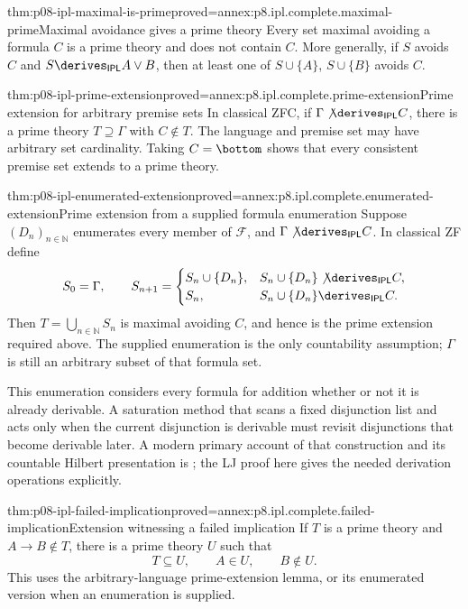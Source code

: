 \begin{hblemma}{thm:p08-ipl-maximal-is-prime}{proved=annex:p8.ipl.complete.maximal-prime}{Maximal avoidance gives a prime theory}
Every set maximal avoiding a formula \(C\) is a prime theory and does
not contain \(C\). More generally, if \(S\) avoids \(C\) and
\(S\derives_{\mathsf{IPL}}A\lor B\), then at least one of
\(S\cup\{A\}\), \(S\cup\{B\}\) avoids \(C\).
\end{hblemma}

\begin{hblemma}{thm:p08-ipl-prime-extension}{proved=annex:p8.ipl.complete.prime-extension}{Prime extension for arbitrary premise sets}
In classical ZFC, if \(\Gamma\not\derives_{\mathsf{IPL}}C\),
there is a prime theory \(T\supseteq\Gamma\) with \(C\notin T\).
The language and premise set may have arbitrary set cardinality.
Taking \(C=\bottom\) shows that every consistent premise set extends
to a prime theory.
\end{hblemma}

\begin{hblemma}{thm:p08-ipl-enumerated-extension}{proved=annex:p8.ipl.complete.enumerated-extension}{Prime extension from a supplied formula enumeration}
Suppose \((D_n)_{n\in\mathbb N}\) enumerates every member of
\(\mathcal F\), and \(\Gamma\not\derives_{\mathsf{IPL}}C\).
In classical ZF define
\[
 S_0=\Gamma,\qquad
 S_{n+1}=
 \begin{cases}
 S_n\cup\{D_n\},&S_n\cup\{D_n\}\not\derives_{\mathsf{IPL}}C,\\
 S_n,&S_n\cup\{D_n\}\derives_{\mathsf{IPL}}C.
 \end{cases}
\]
Then \(T=\bigcup_{n\in\mathbb N}S_n\) is maximal avoiding \(C\),
and hence is the prime extension required above. The supplied enumeration
is the only countability assumption; \(\Gamma\) is still an arbitrary
subset of that formula set.
\end{hblemma}

This enumeration considers every formula for addition whether or not it is
already derivable. A saturation method that scans a fixed disjunction list
and acts only when the current disjunction is derivable must revisit
disjunctions that become derivable later. A modern primary account
of that construction and its countable Hilbert presentation is
\cite[Sections~2--3]{GuoChenBentzen2023IPL}; the LJ proof here gives the
needed derivation operations explicitly.

\begin{hblemma}{thm:p08-ipl-failed-implication}{proved=annex:p8.ipl.complete.failed-implication}{Extension witnessing a failed implication}
If \(T\) is a prime theory and \(A\to B\notin T\), there is a
prime theory \(U\) such that
\[
 T\subseteq U,\qquad A\in U,\qquad B\notin U.
\]
This uses the arbitrary-language prime-extension lemma, or its enumerated
version when an enumeration is supplied.
\end{hblemma}


